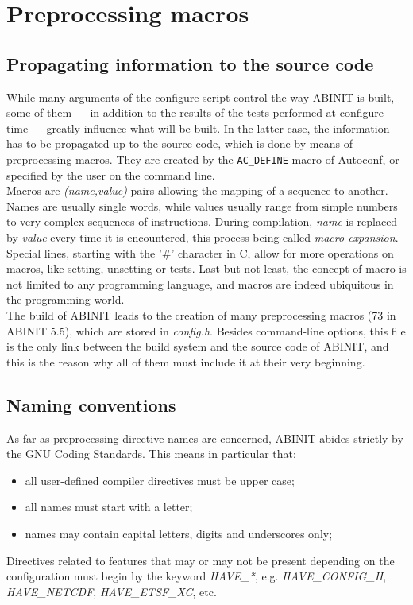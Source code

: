 
\chapter{Preprocessing macros}


\section{Propagating information to the source code}

While many arguments of the configure script control the way ABINIT
is built, some of them -{-}- in addition to the results of the tests
performed at configure-time -{-}- greatly influence \underline{what}
will be built. In the latter case, the information has to be propagated
up to the source code, which is done by means of preprocessing macros.
They are created by the \texttt{AC\_DEFINE} macro of Autoconf, or
specified by the user on the command line. \\


Macros are \textit{(name,value)} pairs allowing the mapping of a sequence
to another. Names are usually single words, while values usually range
from simple numbers to very complex sequences of instructions. During
compilation, \textit{name} is replaced by \textit{value} every time
it is encountered, this process being called \textit{macro expansion}.
Special lines, starting with the '\#' character in C, allow for more
operations on macros, like setting, unsetting or tests. Last but not
least, the concept of macro is not limited to any programming language,
and macros are indeed ubiquitous in the programming world. \\


The build of ABINIT leads to the creation of many preprocessing macros
(73 in ABINIT 5.5), which are stored in \textit{config.h}. Besides
command-line options, this file is the only link between the build
system and the source code of ABINIT, and this is the reason why all
of them must include it at their very beginning.


\section{Naming conventions}

As far as preprocessing directive names are concerned, ABINIT abides
strictly by the GNU Coding Standards. This means in particular that: 
\begin{itemize}
\item all user-defined compiler directives must be upper case; 
\item all names must start with a letter; 
\item names may contain capital letters, digits and underscores only; 
\end{itemize}
Directives related to features that may or may not be present depending
on the configuration must begin by the keyword \textit{HAVE\_{*}},
e.g. \textit{HAVE\_CONFIG\_H}, \textit{HAVE\_NETCDF}, \textit{HAVE\_ETSF\_XC},
etc.


